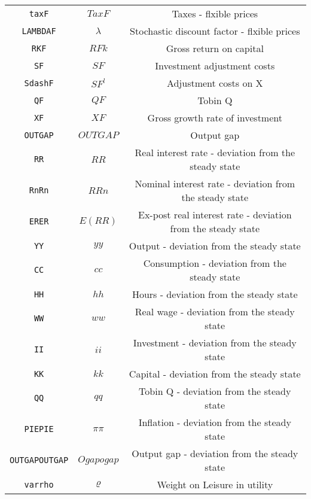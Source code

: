 \begin{center}
\begin{longtable}{ccc}
\texttt{taxF} & $TaxF$ & Taxes - flxible prices\\
\texttt{LAMBDAF} & $\lambda$ & Stochastic discount factor - flxible prices\\
\texttt{RKF} & $RFk$ & Gross return on capital\\
\texttt{SF} & $SF$ & Investment adjustment costs\\
\texttt{SdashF} & $SF^{l}$ & Adjustment costs on X\\
\texttt{QF} & $QF$ & Tobin Q\\
\texttt{XF} & $XF$ & Gross growth rate of investment\\
\texttt{OUTGAP} & $OUTGAP$ & Output gap\\
\texttt{RR} & $RR$ & Real interest rate - deviation from the steady state\\
\texttt{RnRn} & $RRn$ & Nominal interest rate - deviation from the steady state\\
\texttt{ERER} & $E(RR)$ & Ex-post real interest rate - deviation from the steady state\\
\texttt{YY} & $yy$ & Output - deviation from the steady state\\
\texttt{CC} & $cc$ & Consumption - deviation from the steady state\\
\texttt{HH} & $hh$ & Hours - deviation from the steady state\\
\texttt{WW} & $ww$ & Real wage - deviation from the steady state\\
\texttt{II} & $ii$ & Investment - deviation from the steady state\\
\texttt{KK} & $kk$ & Capital - deviation from the steady state\\
\texttt{QQ} & $qq$ & Tobin Q - deviation from the steady state\\
\texttt{PIEPIE} & $\pi\pi$ & Inflation - deviation from the steady state\\
\texttt{OUTGAPOUTGAP} & $Ogapogap$ & Output gap - deviation from the steady state\\
\texttt{varrho} & ${\varrho}$ & Weight on Leisure in utility\\
\hline%
\end{longtable}
\end{center}

